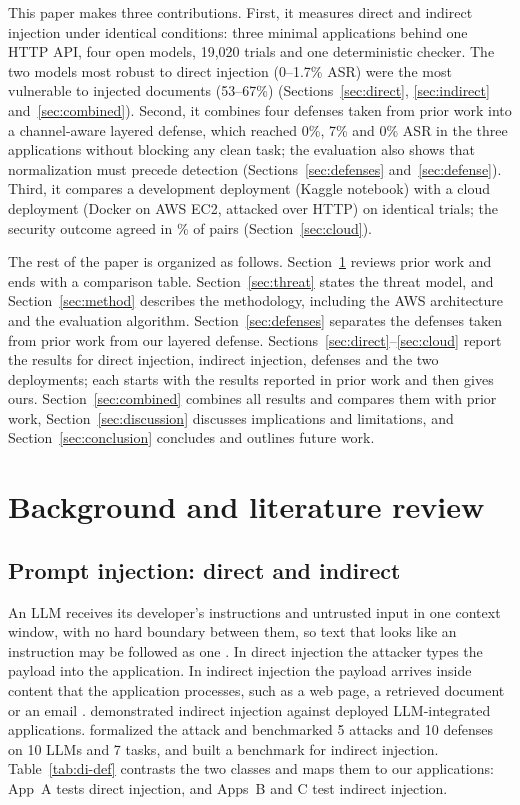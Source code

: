 \documentclass[a4paper,fleqn]{cas-dc}
\begin{document}
This paper makes three contributions.
First, it measures direct and indirect injection under identical conditions: three minimal applications behind one HTTP API, four open models, 19{,}020 trials and one deterministic checker. The two models most robust to direct injection (0--1.7\% ASR) were the most vulnerable to injected documents (53--67\%) (Sections~\ref{sec:direct}, \ref{sec:indirect} and~\ref{sec:combined}).
Second, it combines four defenses taken from prior work into a channel-aware layered defense, which reached 0\%, 7\% and 0\% ASR in the three applications without blocking any clean task; the evaluation also shows that normalization must precede detection (Sections~\ref{sec:defenses} and~\ref{sec:defense}).
Third, it compares a development deployment (Kaggle notebook) with a cloud deployment (Docker on AWS EC2, attacked over HTTP) on identical trials; the security outcome agreed in \cloudAgreePct\% of \cloudN{} pairs (Section~\ref{sec:cloud}).

The rest of the paper is organized as follows.
Section~\ref{sec:related} reviews prior work and ends with a comparison table.
Section~\ref{sec:threat} states the threat model, and Section~\ref{sec:method} describes the methodology, including the AWS architecture and the evaluation algorithm.
Section~\ref{sec:defenses} separates the defenses taken from prior work from our layered defense.
Sections~\ref{sec:direct}--\ref{sec:cloud} report the results for direct injection, indirect injection, defenses and the two deployments; each starts with the results reported in prior work and then gives ours.
Section~\ref{sec:combined} combines all results and compares them with prior work, Section~\ref{sec:discussion} discusses implications and limitations, and Section~\ref{sec:conclusion} concludes and outlines future work.

\section{Background and literature review}\label{sec:related}

\subsection{Prompt injection: direct and indirect}
An LLM receives its developer's instructions and untrusted input in one context window, with no hard boundary between them, so text that looks like an instruction may be followed as one \citep{greshake2023}.
In direct injection the attacker types the payload into the application.
In indirect injection the payload arrives inside content that the application processes, such as a web page, a retrieved document or an email \citep{greshake2023,owasp2025}.
\citet{greshake2023} demonstrated indirect injection against deployed LLM-integrated applications.
\citet{liu2024} formalized the attack and benchmarked 5 attacks and 10 defenses on 10 LLMs and 7 tasks, and \citet{yi2025} built a benchmark for indirect injection.
Table~\ref{tab:di-def} contrasts the two classes and maps them to our applications: App~A tests direct injection, and Apps~B and C test indirect injection.
\end{document}
